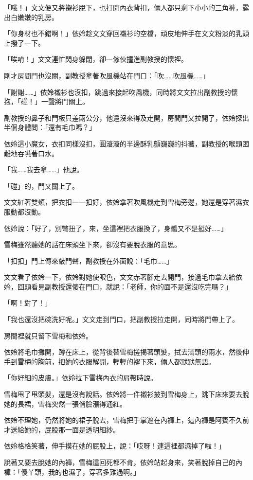 「哦！」文文便又將襯衫脫下，也打開內衣背扣，倆人都只剩下小小的三角褲，露出白嫩嫩的乳房。

「你身材也不錯啊！」依姈趁文文穿回襯衫的空檔，頑皮地伸手在文文粉淡的乳頭上撥了一下。

「唉唷！」文文連忙閃身躲閉，卻一傢伙撞進副教授的懷裡。

剛才房間門也沒關，副教授拿著吹風機站在門口：「吹……吹風機……」

「謝謝……」依姈襯衫也沒扣，跳過來接起吹風機，同時將文文拉出副教授的懷抱，「碰！」一聲將門關上。

副教授的鼻子和門板只差兩公分，他還沒來得及走開，房間門又拉開了，依姈探出半個身體問：「還有毛巾嗎？」

依姈這小魔女，衣扣同樣沒扣，圓滾滾的半邊酥乳顫巍巍的抖著，副教授的喉頭困難地吞嚥著口水。

「我……我去拿……」他說。

「碰」的，門又關上了。

文文紅著雙頰，把衣扣一一扣好，依姈拿著吹風機走到雪梅旁邊，她還是穿著濕衣服動都沒動。

依姈說：「好了，別彆扭了，來，坐這裡把衣服換了，身體又不是挺好……」

雪梅雖然聽她的話在床頭坐下來，卻沒有要脫衣服的意思。

「扣扣」門上傳來敲門聲，副教授在外面說：「毛巾……」

文文看了依姈一下，依姈對她使眼色，文文赤著腳走去開門，接過毛巾拿去給依姈，回頭看見副教授還傻在門口，就說：「老師，你的面不是還沒吃完嗎？」

「啊！對了！」

「我也還沒把碗洗好呢。」文文走到門口，把副教授拉走開，同時將門帶上了。

房間裡就只留下雪梅和依姈。

依姈將毛巾攤開，蹲在床上，從背後替雪梅搓揭著頭髮，拭去滿頭的雨水，然後伸手到雪梅的胸前，把她的衣服解開，輕輕的褪下來，倆人都默默無語。

「你好細的皮膚。」依姈拉下雪梅內衣的肩帶時說。

雪梅甩了甩頭髮，還是沒有說話。依姈將一件襯衫披到雪梅身上，跳下床來要去脫她的長裙，雪梅突然一張俏臉漲得通紅。

依姈不理她，仍然將她的裙子脫去，雪梅把手掌遮在內褲上，這內褲是阿賓不久前才送給她的，屁股那一面是透明細紗。

依姈格格笑著，伸手摸在她的屁股上，說：「哎呀！連這裡都濕掉了啦！」

說著又要去脫她的內褲，雪梅這回死都不肯，依姈站起身來，笑著脫掉自己的內褲：「傻丫頭，我的也濕了，穿著多難過啊。」


